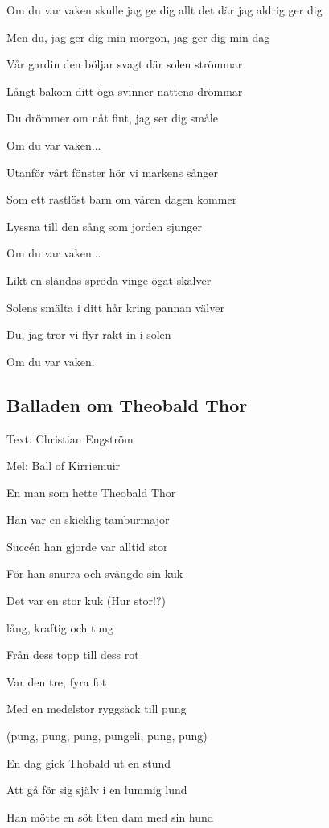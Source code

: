 Om du var vaken skulle jag ge dig allt det där jag aldrig ger dig

Men du, jag ger dig min morgon, jag ger dig min dag\bigskip

Vår gardin den böljar svagt där solen strömmar

Långt bakom ditt öga svinner nattens drömmar

Du drömmer om nåt fint, jag ser dig småle

Om du var vaken... \bigskip

Utanför vårt fönster hör vi markens sånger

Som ett rastlöst barn om våren dagen kommer

Lyssna till den sång som jorden sjunger

Om du var vaken...\bigskip

Likt en sländas spröda vinge ögat skälver

Solens smälta i ditt hår kring pannan välver

Du, jag tror vi flyr rakt in i solen

Om du var vaken.\bigskip

\subsection{\textbf{Balladen om Theobald Thor}}

Text: Christian Engström

Mel: Ball of Kirriemuir\bigskip

En man som hette Theobald Thor

Han var en skicklig tamburmajor

Succén han gjorde var alltid stor

För han snurra och svängde sin kuk\bigskip



Det var en stor kuk (Hur stor!?)

lång, kraftig och tung

Från dess topp till dess rot

Var den tre, fyra fot

Med en medelstor ryggsäck till pung

(pung, pung, pung, pungeli,  pung, pung)\bigskip



En dag gick Thobald ut en stund

Att gå för sig själv i en lummig lund

Han mötte en söt liten dam med sin hund

